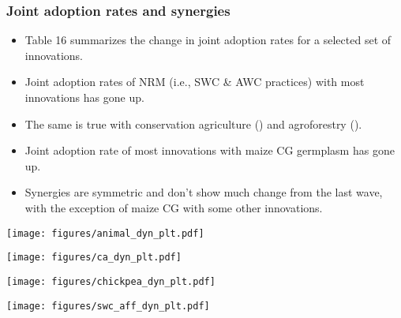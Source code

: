 \documentclass[11pt]{beamer}
\begin{document}
\begin{frame}
\label{frthpg}
\frametitle{Joint adoption rates and synergies}
\begin{itemize}

\item  Table 16 summarizes the change in joint adoption rates for a selected set of innovations. 

\item Joint adoption rates of NRM (i.e., SWC \& AWC practices) with most innovations has gone up. \hyperlink{nrmjointplt}{}

\item The same is true with conservation agriculture (\hyperlink{cajointplt}{}) and agroforestry (\hyperlink{agrfrstjointplt}{}). 

\item Joint adoption rate of most innovations with maize CG germplasm has gone up. \hyperlink{maizejointplt}{}

\item Synergies are symmetric and don't show much change from the last wave, with the exception of maize CG with some other innovations. \hyperlink{synergydyn}{}

\end{itemize}

\end{frame}



\begin{frame}
\label{animaldynplt}
\texttt{[image: figures/animal\_dyn\_plt.pdf]}
\hyperlink{frstpg}{}
\end{frame}


\begin{frame}
\label{cadynplt}
\texttt{[image: figures/ca\_dyn\_plt.pdf]}
\hyperlink{frstpg}{}
\end{frame}

\begin{frame}
\label{kabulidynplt}
\texttt{[image: figures/chickpea\_dyn\_plt.pdf]}
\hyperlink{frstpg}{}
\end{frame}

\begin{frame}
\label{swcaffdynplt}
\texttt{[image: figures/swc\_aff\_dyn\_plt.pdf]}
\hyperlink{frstpg}{}
\end{frame}
\end{document}
